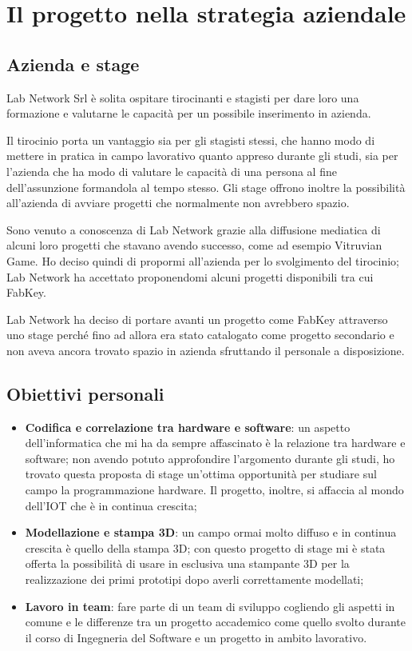 
\chapter{Il progetto nella strategia aziendale}
\label{cap:processi-metodologie}

\section{Azienda e stage}
Lab Network Srl è solita ospitare tirocinanti e stagisti per dare loro una formazione e valutarne le capacità per un possibile inserimento in azienda.

Il tirocinio porta un vantaggio sia per gli stagisti stessi, che hanno modo di mettere in pratica in campo lavorativo quanto appreso durante gli studi, sia per l'azienda che ha modo di valutare le capacità di una persona al fine dell'assunzione formandola al tempo stesso. Gli stage offrono inoltre la possibilità all'azienda di avviare progetti che normalmente non avrebbero spazio. 

Sono venuto a conoscenza di Lab Network grazie alla diffusione mediatica di alcuni loro progetti che stavano avendo successo, come ad esempio Vitruvian Game. Ho deciso quindi di propormi all'azienda per lo svolgimento del tirocinio; Lab Network ha accettato proponendomi alcuni progetti disponibili tra cui FabKey.

Lab Network ha deciso di portare avanti un progetto come FabKey attraverso uno stage perché fino ad allora era stato catalogato come progetto secondario e non aveva ancora trovato spazio in azienda sfruttando il personale a disposizione.


\section{Obiettivi personali}
\begin{itemize}
\item \textbf{Codifica e correlazione tra hardware e software}: un aspetto dell'informatica che mi ha da sempre affascinato è la relazione tra hardware e software; non avendo potuto approfondire l'argomento durante gli studi, ho trovato questa proposta di stage un'ottima opportunità per studiare sul campo la programmazione hardware. Il progetto, inoltre, si affaccia al mondo dell'IOT che è in continua crescita;
\item \textbf{Modellazione e stampa 3D}: un campo ormai molto diffuso e in continua crescita è quello della stampa 3D; con questo progetto di stage mi è stata offerta la possibilità di usare in esclusiva una stampante 3D per la realizzazione dei primi prototipi dopo averli correttamente modellati;
\item \textbf{Lavoro in team}: fare parte di un team di sviluppo cogliendo gli aspetti in comune e le differenze tra un progetto accademico come quello svolto durante il corso di Ingegneria del Software e un progetto in ambito lavorativo.
\end{itemize}


